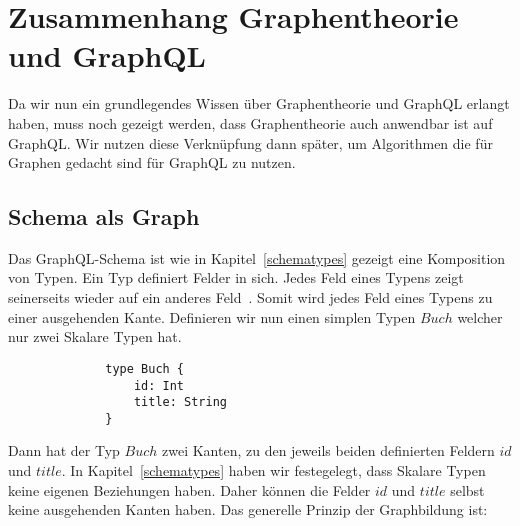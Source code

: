 \section{Zusammenhang Graphentheorie und GraphQL}
\label{graphtheorieQL}

Da wir nun ein grundlegendes Wissen über Graphentheorie und GraphQL erlangt haben, muss noch gezeigt werden,
dass Graphentheorie auch anwendbar ist auf GraphQL.
Wir nutzen diese Verknüpfung dann später, um Algorithmen die für Graphen gedacht sind für GraphQL zu nutzen.

\subsection{Schema als Graph}

Das GraphQL-Schema ist wie in Kapitel~\ref{schematypes} gezeigt eine Komposition von Typen.
Ein Typ definiert Felder in sich.
Jedes Feld eines Typens zeigt seinerseits wieder auf ein anderes Feld~\cite[vgl. Modelling with GraphQL]{graphqlgraphtheory}.
Somit wird jedes Feld eines Typens zu einer ausgehenden Kante.
Definieren wir nun einen simplen Typen $Buch$ welcher nur zwei Skalare Typen hat.

\begin{figure}[ht]
    \centering
    \begin{minipage}[b]{0.4\textwidth}
        \begin{verbatim}
        type Buch {
            id: Int
            title: String
        }
        \end{verbatim}
    \end{minipage}
    \hfill
    \begin{minipage}[b]{0.4\textwidth}
    \end{minipage}
\end{figure}

Dann hat der Typ $Buch$ zwei Kanten, zu den jeweils beiden definierten Feldern $id$ und $title$.
In Kapitel~\ref{schematypes} haben wir festegelegt, dass Skalare Typen keine eigenen Beziehungen haben.
Daher können die Felder $id$ und $title$ selbst keine ausgehenden Kanten haben.
Das generelle Prinzip der Graphbildung ist:

